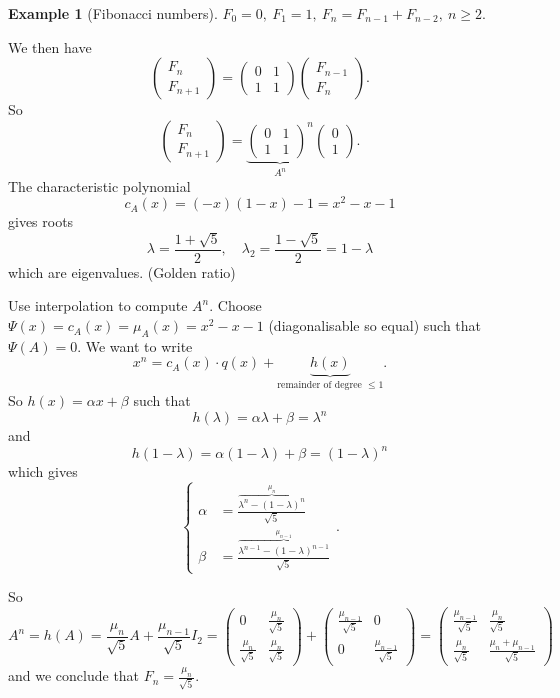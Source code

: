 \documentclass[a4paper]{article}
\theoremstyle{definition}
\newtheorem{example}[defn]{Example}
\begin{document}
\begin{example}[Fibonacci numbers]
$F_0=0,\ F_1=1,\ F_n=F_{n-1}+F_{n-2},\ n\geq 2$.

We then have
\[
\begin{pmatrix}F_n \\F_{n+1}\end{pmatrix} = \begin{pmatrix}0&1\\1&1\end{pmatrix}\begin{pmatrix}F_{n-1}\\F_{n}\end{pmatrix}.
\]
So
\[
\begin{pmatrix}F_n \\F_{n+1}\end{pmatrix} = \underbrace{\begin{pmatrix}0&1\\1&1\end{pmatrix}^n}_{A^n}\begin{pmatrix}0\\1\end{pmatrix}.
\]
The characteristic polynomial
\[
c_A(x)=(-x)(1-x)-1=x^2-x-1
\]
gives roots
\[
\lambda=\frac{1+ \sqrt 5}{2},\quad \lambda_2=\frac{1- \sqrt 5}{2}=1-\lambda
\]
which are eigenvalues. (Golden ratio)

Use interpolation to compute $A^n$. Choose $\Psi (x)=c_A(x)=\mu_A(x)=x^2-x-1$ (diagonalisable so equal) such that $\Psi(A)=0$. We want to write
\[
x^n=c_A(x) \cdot q(x) + \underbrace{h(x)}_{\text{remainder of degree }\leq 1} .
\]
So $h(x)=\alpha x+\beta$ such that
\[
h(\lambda)=\alpha \lambda + \beta=\lambda ^n
\]
and
\[
h(1-\lambda)=\alpha (1-\lambda)+\beta = (1-\lambda)^n
\]
which gives
\[
\left\{\begin{aligned}\alpha &=\frac{\overbrace{\lambda ^n-(1-\lambda)^n}^{\mu_n}}{\sqrt 5} \\ \beta &=\frac{\overbrace{\lambda^{n-1}-(1-\lambda)^{n-1}}^{\mu_{n-1}}}{\sqrt 5}\end{aligned}\right. .
\]

So
\[
A^n=h(A)=\frac{\mu_n}{\sqrt 5}A+\frac{\mu_{n-1}}{\sqrt 5} I_2 = \begin{pmatrix} 0 & \frac{\mu_n}{\sqrt 5} \\ \frac{\mu_n}{\sqrt 5}&\frac{\mu_n}{\sqrt 5} \end{pmatrix}+\begin{pmatrix}\frac{\mu_{n-1}}{\sqrt 5}&0\\0&\frac{\mu_{n-1}}{\sqrt 5}\end{pmatrix}=\begin{pmatrix}\frac{\mu_{n-1}}{\sqrt 5}&\frac{\mu_n}{\sqrt 5}\\\frac{\mu_n}{\sqrt 5}&\frac{\mu_n+\mu_{n-1}}{\sqrt 5}\end{pmatrix}
\]
and we conclude that $\displaystyle F_n=\frac{\mu_n}{\sqrt 5}$.
\end{example}
\end{document}
